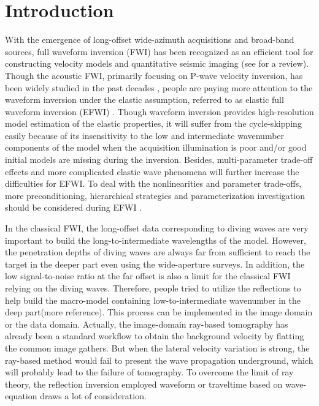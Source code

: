 \section{Introduction}
With the emergence of long-offset wide-azimuth acquisitions and broad-band sources,
full waveform inversion (FWI) has been recognized as an
efficient tool for constructing velocity models and quantitative seismic imaging (see
\cite{virieux2009overview} for a review).
Though the acoustic FWI, primarily focusing on P-wave velocity inversion, has been
widely studied in the past decades
\cite[]{tarantola1984,pratt1998gauss,shipp:2002}, people are paying more attention
to the waveform inversion under the elastic assumption, referred to as elastic full waveform inversion
(EFWI) \cite[]{tarantola1986}.
Though waveform inversion provides high-resolution model estimation of the elastic
properties, it
will suffer from the cycle-skipping easily because of its insensitivity to the low and intermediate wavenumber components of the model
when the acquisition illumination is poor and/or good initial models are missing during the inversion\cite[]{sears2008,brossier2009}. 
Besides, multi-parameter trade-off effects and more complicated elastic wave phenomena 
will further increase the difficulties for EFWI.
To deal with the nonlinearities and parameter trade-offs, more
preconditioning, hierarchical strategies and parameterization investigation should be
considered during EFWI 
\cite[]{sears2008,prieux:2013b,operto2013guided,wang:2015,Oh2016}.

In the classical FWI, the long-offset data
corresponding to diving waves are very important to build the long-to-intermediate
wavelengths of the model. However, the penetration depths of
diving waves are always far from sufficient to reach the target in the deeper part
even using the wide-aperture surveys. 
In addition, the low signal-to-noise ratio at the far
offset is also a limit for the classical FWI relying on the diving waves. 
Therefore, people tried to utilize the reflections
to help build the macro-model containing low-to-intermediate wavenumber
in the deep part\cite[]{ChaventEtAl1994,clement:2001,999999}{\color{red}(more
reference)}.
This process can be implemented in the image domain or the data domain. 
Actually, the image-domain ray-based tomography
\cite[]{Woodward1992,Woodward2008,Jones2010} has already been a standard workflow to obtain the background velocity by flatting the common
image gathers. But when the lateral velocity variation is strong, the ray-based method would fail to
present the wave propagation underground, which will probably lead to the failure of tomography.  
To overcome the limit of ray theory, 
the reflection inversion employed waveform or traveltime based on wave-equation
draws a lot of consideration\cite[]{xu:2012,Ma2013,Wu2015b,Zhou2015,Wang2015,Chi2015}.


